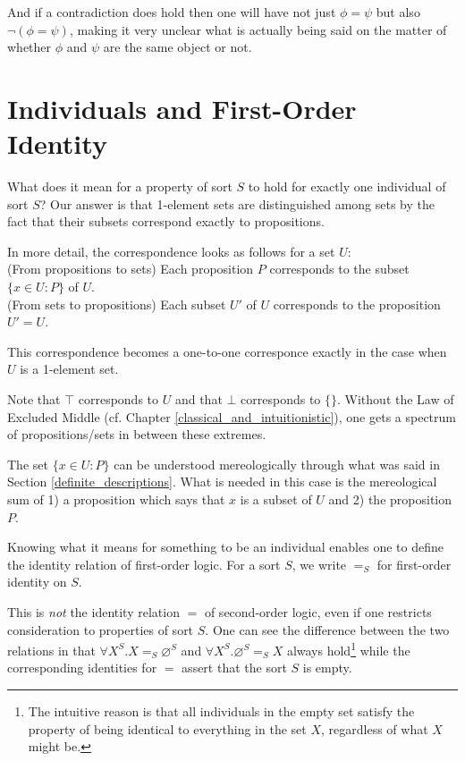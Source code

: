 \documentclass[12pt]{book}
\begin{document}
And if a contradiction does hold then one will have not just $\phi = \psi$ but also $\neg (\phi = \psi)$, making it very unclear what is actually being said on the matter of whether $\phi$ and $\psi$ are the same object or not.

\section{Individuals and First-Order Identity} \label{individuals_and_fol_identity}
What does it mean for a property of sort $S$ to hold for exactly one individual of sort $S$? Our answer is that 1-element sets are distinguished among sets by the fact that their subsets correspond exactly to propositions.

In more detail, the correspondence looks as follows for a set $U$:\\
(From propositions to sets) Each proposition $P$ corresponds to the subset $\{x \in U: P\}$ of $U$.\\
(From sets to propositions) Each subset $U'$ of $U$ corresponds to the proposition $U' = U$.

This correspondence becomes a one-to-one corresponce exactly in the case when $U$ is a 1-element set.

Note that $\top$ corresponds to $U$ and that $\bot$ corresponds to $\{\}$. Without the Law of Excluded Middle (cf. Chapter \ref{classical_and_intuitionistic}), one gets a spectrum of propositions/sets in between these extremes.

The set $\{x \in U: P\}$ can be understood mereologically through what was said in Section \ref{definite_descriptions}. What is needed in this case is the mereological sum of 1) a proposition which says that $x$ is a subset of $U$ and 2) the proposition $P$.

Knowing what it means for something to be an individual enables one to define the identity relation of first-order logic. For a sort $S$, we write $=_S$ for first-order identity on $S$.

This is \textit{not} the identity relation $=$ of second-order logic, even if one restricts consideration to properties of sort $S$. One can see the difference between the two relations in that $\forall X^S. X =_S \varnothing^S$ and $\forall X^S. \varnothing^S =_S X$ always hold\footnote{The intuitive reason is that all individuals in the empty set satisfy the property of being identical to everything in the set $X$, regardless of what $X$ might be.} while the corresponding identities for $=$ assert that the sort $S$ is empty.
\end{document}
